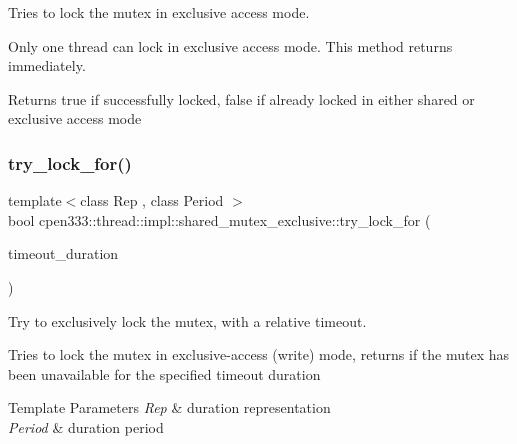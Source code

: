 Tries to lock the mutex in exclusive access mode. 

Only one thread can lock in exclusive access mode. This method returns immediately.

\begin{DoxyReturn}{Returns}
true if successfully locked, false if already locked in either shared or exclusive access mode 
\end{DoxyReturn}
\mbox{\label{classcpen333_1_1thread_1_1impl_1_1shared__mutex__exclusive_a1416304bf7a677384b1bd27a678bff9b}} 
\subsubsection{\texorpdfstring{try\+\_\+lock\+\_\+for()}{try\_lock\_for()}}
{\footnotesize\ttfamily template$<$class Rep , class Period $>$ \\
bool cpen333\+::thread\+::impl\+::shared\+\_\+mutex\+\_\+exclusive\+::try\+\_\+lock\+\_\+for (\begin{DoxyParamCaption}\item[{const std\+::chrono\+::duration$<$ Rep, Period $>$ \&}]{timeout\+\_\+duration }\end{DoxyParamCaption})\hspace{0.3cm}{\ttfamily [inline]}}



Try to exclusively lock the mutex, with a relative timeout. 

Tries to lock the mutex in exclusive-\/access (write) mode, returns if the mutex has been unavailable for the specified timeout duration


\begin{DoxyTemplParams}{Template Parameters}
{\em Rep} & duration representation \\
\hline
{\em Period} & duration period \\
\hline
\end{DoxyTemplParams}

